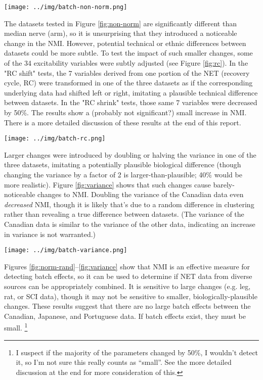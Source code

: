 \documentclass[12pt]{article}
\begin{document}
\begin{figure*}
  \centering
       \texttt{[image: ../img/batch-non-norm.png]}
  \label{fig:non-norm}
\end{figure*}

The datasets tested in Figure \ref{fig:non-norm} are significantly different than median nerve (arm), so it is unsurprising that they introduced a noticeable change in the NMI. However, potential technical or ethnic differences between datasets could be more subtle. To test the impact of such smaller changes, some of the 34 excitability variables were subtly adjusted (see Figure \ref{fig:rc}). In the "RC shift" tests, the 7 variables derived from one portion of the NET (recovery cycle, RC) were transformed in one of the three datasets as if the corresponding underlying data had shifted left or right, imitating a plausible technical difference between datasets. In the "RC shrink" tests, those same 7 variables were decreased by 50\%. The results show a (probably not significant?) small increase in NMI. There is a more detailed discussion of these results at the end of this report.

\begin{figure*}
  \centering
       \texttt{[image: ../img/batch-rc.png]}
  \label{fig:rc}
\end{figure*}

Larger changes were introduced by doubling or halving the variance in one of the three datasets, imitating a potentially plausible biological difference (though changing the variance by a factor of 2 is larger-than-plausible; 40\% would be more realistic). Figure \ref{fig:variance} shows that such changes cause barely-noticeable changes to NMI. Doubling the variance of the Canadian data even \emph{decreased} NMI, though it is likely that's due to a random difference in clustering rather than revealing a true difference between datasets. (The variance of the Canadian data is similar to the variance of the other data, indicating an increase in variance is not warranted.)

\begin{figure*}
  \centering
       \texttt{[image: ../img/batch-variance.png]}
  \label{fig:variance}
\end{figure*}

Figures \ref{fig:norm-rand}–\ref{fig:variance} show that NMI is an effective measure for detecting batch effects, so it can be used to determine if NET data from diverse sources can be appropriately combined. It is sensitive to large changes (e.g. leg, rat, or SCI data), though it may not be sensitive to smaller, biologically-plausible changes. These results suggest that there are no large batch effects between the Canadian, Japanese, and Portuguese data. If batch effects exist, they must be small. \footnote{I suspect if the majority of the parameters changed by 50\%, I wouldn't detect it, so I'm not sure this really counts as ``small''. See the more detailed discussion at the end for more consideration of this.}
\end{document}
